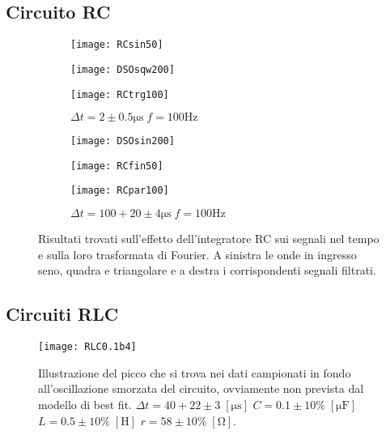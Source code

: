 \documentclass{article}[a4paper, oneside, 11pt]
\begin{document}
\subsection{Circuito RC}
\begin{figure}[!htb]
\centering
	\begin{subfigure}{.5\textwidth}
	\texttt{[image: RCsin50]}
	\caption{$\Delta t = 100 + 20 \pm 4 \si{\us} \; f = 50 \si{\Hz}$}
	\texttt{[image: DSOsqw200]}
	\caption{$\Delta t = 2 \pm 0.5 \si{\us} \; f = 200 \si{\Hz}$}
	\texttt{[image: RCtrg100]}
	\caption{$\Delta t = 2 \pm 0.5 \si{\us} \; f = 100 \si{\Hz}$}
\label{fig: RCin}
	\end{subfigure}%
	\begin{subfigure}{.5\textwidth}
	\texttt{[image: DSOsin200]}
	\caption{$\Delta t = 2 \pm 0.5 \si{\us} \; f = 200 \si{\Hz}$}
	\texttt{[image: RCfin50]}
	\caption{$\Delta t = 100 + 20 \pm 4 \si{\us} \; f = 50 \si{\Hz}$}
	\texttt{[image: RCpar100]}
	\caption{$\Delta t = 100 + 20 \pm 4 \si{\us} \; f = 100 \si{\Hz}$}
\label{fig: Rcint}
	\end{subfigure}%
	\caption{Risultati trovati sull'effetto dell'integratore RC sui segnali
			nel tempo e sulla loro trasformata di Fourier. A sinistra le
			onde in ingresso seno, quadra e triangolare e a destra i corrispondenti 
		 	segnali filtrati. \label{fig: RCall}}
\end{figure}

\subsection{Circuiti RLC}
\begin{figure}[!htb]
\centering
	\texttt{[image: RLC0.1b4]}
	\caption{Illustrazione del picco che si trova nei dati campionati
			in fondo all'oscillazione smorzata del circuito, ovviamente
			non prevista dal modello di best fit. 
			$\Delta t = 40 + 22 \pm 3 \; [\si{\us}]$ $C = 0.1 \pm 10\% \;
			[\si{\micro\F}]$ $L = 0.5 \pm 10 \% \; [\si{\henry}]$ $r = 58 \pm 10\% 
			\; [\si{\ohm}]$. \label{fig: RLC0.1b4}}
\end{figure}
\end{document}
